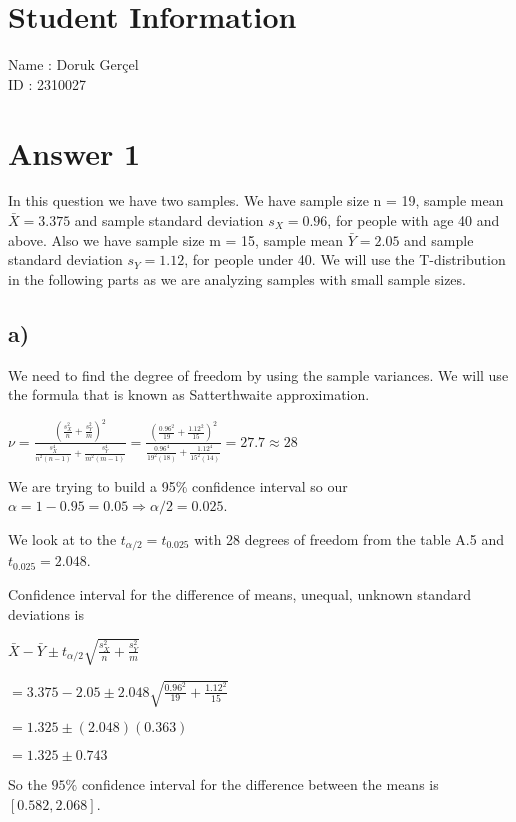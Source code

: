 \documentclass[12pt]{article}
\begin{document}

\section*{Student Information}

Name : Doruk Gerçel\\

ID : 2310027\\


\section*{Answer 1}
In this question we have two samples. We have sample size n = 19, sample mean $\bar{X} = 3.375$ and sample standard deviation $s_X = 0.96$, for people with age 40 and above. Also we have sample size m = 15, sample mean $\bar{Y} = 2.05$ and sample standard deviation $s_Y = 1.12$, for people under 40. We will use the T-distribution in the following parts as we are analyzing samples with small sample sizes.
\subsection*{a)}
We need to find the degree of freedom by using the sample variances. We will use the formula that is known as Satterthwaite approximation.\\ \par 
$\nu = \frac{(\frac{s_X^2}{n} + \frac{s_Y^2}{m})^2}{\frac{s_X^4}{n^2(n-1)} + \frac{s_Y^4}{m^2(m-1)}} = \frac{(\frac{0.96^2}{19} + \frac{1.12^2}{15})^2}{\frac{0.96^4}{19^2(18)} + \frac{1.12^4}{15^2(14)}} = 27.7 \approx 28$\\ \par 
We are trying to build a 95$\%$ confidence interval so our $\alpha = 1 - 0.95 = 0.05 \Rightarrow \alpha / 2 = 0.025$.\par 
We look at to the $t_{\alpha / 2} = t_{0.025}$ with 28 degrees of freedom from the table A.5 and $t_{0.025} = 2.048$.\par 
Confidence interval for the difference of means, unequal, unknown standard deviations is\\ \par 
$\bar{X} - \bar{Y} \pm t_{\alpha / 2} \sqrt{\frac{s_X^2}{n} + \frac{s_Y^2}{m}}$\\ \par 
$= 3.375 - 2.05 \pm 2.048 \sqrt{\frac{0.96^2}{19} + \frac{1.12^2}{15}}$\\ \par 
$=1.325 \pm (2.048)(0.363)$\\ \par 
$=1.325 \pm 0.743$\\ \par 
So the $95 \%$ confidence interval for the difference between the means is $\left[ 0.582, 2.068 \right]$.
\end{document}
